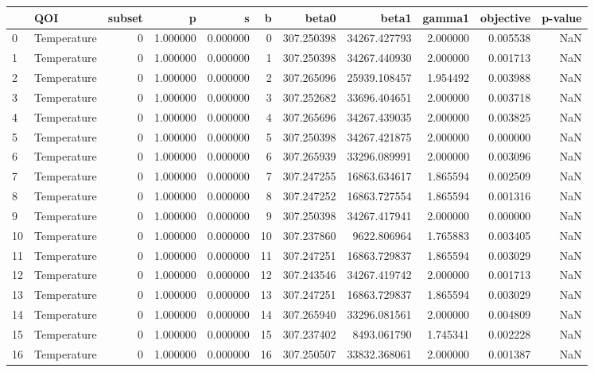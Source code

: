 \begin{tabular}{llrrrrrrrrr}
\toprule
 & QOI & subset & p & s & b & beta0 & beta1 & gamma1 & objective & p-value \\
\midrule
0 & Temperature & 0 & 1.000000 & 0.000000 & 0 & 307.250398 & 34267.427793 & 2.000000 & 0.005538 & NaN \\
1 & Temperature & 0 & 1.000000 & 0.000000 & 1 & 307.250398 & 34267.440930 & 2.000000 & 0.001713 & NaN \\
2 & Temperature & 0 & 1.000000 & 0.000000 & 2 & 307.265096 & 25939.108457 & 1.954492 & 0.003988 & NaN \\
3 & Temperature & 0 & 1.000000 & 0.000000 & 3 & 307.252682 & 33696.404651 & 2.000000 & 0.003718 & NaN \\
4 & Temperature & 0 & 1.000000 & 0.000000 & 4 & 307.265696 & 34267.439035 & 2.000000 & 0.003825 & NaN \\
5 & Temperature & 0 & 1.000000 & 0.000000 & 5 & 307.250398 & 34267.421875 & 2.000000 & 0.000000 & NaN \\
6 & Temperature & 0 & 1.000000 & 0.000000 & 6 & 307.265939 & 33296.089991 & 2.000000 & 0.003096 & NaN \\
7 & Temperature & 0 & 1.000000 & 0.000000 & 7 & 307.247255 & 16863.634617 & 1.865594 & 0.002509 & NaN \\
8 & Temperature & 0 & 1.000000 & 0.000000 & 8 & 307.247252 & 16863.727554 & 1.865594 & 0.001316 & NaN \\
9 & Temperature & 0 & 1.000000 & 0.000000 & 9 & 307.250398 & 34267.417941 & 2.000000 & 0.000000 & NaN \\
10 & Temperature & 0 & 1.000000 & 0.000000 & 10 & 307.237860 & 9622.806964 & 1.765883 & 0.003405 & NaN \\
11 & Temperature & 0 & 1.000000 & 0.000000 & 11 & 307.247251 & 16863.729837 & 1.865594 & 0.003029 & NaN \\
12 & Temperature & 0 & 1.000000 & 0.000000 & 12 & 307.243546 & 34267.419742 & 2.000000 & 0.001713 & NaN \\
13 & Temperature & 0 & 1.000000 & 0.000000 & 13 & 307.247251 & 16863.729837 & 1.865594 & 0.003029 & NaN \\
14 & Temperature & 0 & 1.000000 & 0.000000 & 14 & 307.265940 & 33296.081561 & 2.000000 & 0.004809 & NaN \\
15 & Temperature & 0 & 1.000000 & 0.000000 & 15 & 307.237402 & 8493.061790 & 1.745341 & 0.002228 & NaN \\
16 & Temperature & 0 & 1.000000 & 0.000000 & 16 & 307.250507 & 33832.368061 & 2.000000 & 0.001387 & NaN \\

\end{tabular}
